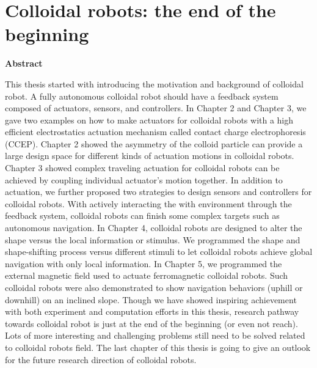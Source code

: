 \chapter{Colloidal robots: the end of the beginning }
\begin{center}
\textbf{Abstract}
\end{center}
This thesis started with introducing the motivation and background of colloidal robot. A fully autonomous colloidal robot should have a feedback system composed of actuators, sensors, and controllers.  In Chapter 2 and Chapter 3, we gave two examples on how to make actuators for colloidal robots with a high efficient electrostatics actuation mechanism called contact charge electrophoresis (CCEP). Chapter 2 showed the asymmetry of the colloid particle can provide a large design space for different kinds of actuation motions in colloidal robots.  Chapter 3 showed complex traveling actuation for colloidal robots can be achieved by coupling individual actuator's motion together.  In addition to actuation, we further proposed two strategies to design sensors and controllers for colloidal robots. With actively interacting the with environment through the feedback system, colloidal robots can finish some complex targets such as autonomous navigation. In Chapter 4, colloidal robots are designed to alter the shape versus the local information or stimulus. We programmed the shape and shape-shifting process versus different stimuli to let colloidal robots achieve global navigation with only local information. In Chapter 5, we programmed the external magnetic field used to actuate ferromagnetic colloidal robots. Such colloidal robots were also demonstrated to show navigation behaviors  (uphill or downhill) on an inclined slope. Though we have showed inspiring achievement with both experiment and computation efforts in this thesis, research pathway towards colloidal robot is just at the end of the beginning (or even not reach). Lots of more interesting and challenging problems still need to be solved related to colloidal robots field. The last chapter of this thesis is going to give an outlook for the future research direction of colloidal robots.
